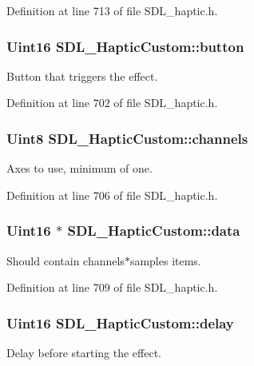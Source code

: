 Definition at line 713 of file S\+D\+L\+\_\+haptic.\+h.

\hypertarget{structSDL__HapticCustom_aa4fbaf7220f3197aa6631b3e64ad6562}{
\subsubsection[{button}]{\setlength{\rightskip}{0pt plus 5cm}Uint16 S\+D\+L\+\_\+\+Haptic\+Custom\+::button}}\label{structSDL__HapticCustom_aa4fbaf7220f3197aa6631b3e64ad6562}
Button that triggers the effect. 

Definition at line 702 of file S\+D\+L\+\_\+haptic.\+h.

\hypertarget{structSDL__HapticCustom_a560215762e9096d583d75867d9227cf5}{
\subsubsection[{channels}]{\setlength{\rightskip}{0pt plus 5cm}Uint8 S\+D\+L\+\_\+\+Haptic\+Custom\+::channels}}\label{structSDL__HapticCustom_a560215762e9096d583d75867d9227cf5}
Axes to use, minimum of one. 

Definition at line 706 of file S\+D\+L\+\_\+haptic.\+h.

\hypertarget{structSDL__HapticCustom_a3c3366f759e8f071468305141c8684ce}{
\subsubsection[{data}]{\setlength{\rightskip}{0pt plus 5cm}Uint16 $\ast$ S\+D\+L\+\_\+\+Haptic\+Custom\+::data}}\label{structSDL__HapticCustom_a3c3366f759e8f071468305141c8684ce}
Should contain channels$\ast$samples items. 

Definition at line 709 of file S\+D\+L\+\_\+haptic.\+h.

\hypertarget{structSDL__HapticCustom_a094229466ff4cf695860db664100a2b0}{
\subsubsection[{delay}]{\setlength{\rightskip}{0pt plus 5cm}Uint16 S\+D\+L\+\_\+\+Haptic\+Custom\+::delay}}\label{structSDL__HapticCustom_a094229466ff4cf695860db664100a2b0}
Delay before starting the effect. 

